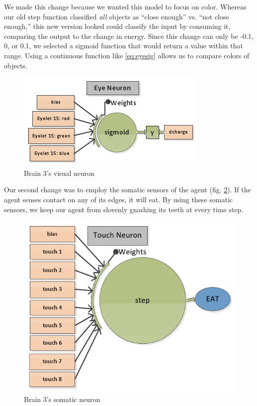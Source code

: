 We made this change because we wanted this model to focus on color. Whereas
our old step function classified \emph{all} objects as ``close enough'' vs. 
``not close enough,'' this new version looked could classify the input by 
consuming it, comparing the output to the change in energy. Since this change 
can only be -0.1, 0, or 0.1, we selected a sigmoid function that would return 
a value within that range. Using a continuous function like \eqref{eq:eyesig} 
allows us to compare colors of objects.

\begin{figure}
\begin{center}
  \includegraphics[scale=.7]{img/brain3eye.png}
  \caption{Brain 3's visual neuron}
  \label{fig:brain3eye}
\end{center}
\end{figure}

Our second change was to employ the somatic sensors of the agent
(fig. \ref{fig:brain3touch}). If the agent senses contact on any of its edges, 
it will eat. By using these somatic sensors, we keep our agent from slovenly
gnashing its teeth at every time step.

\begin{figure}
\begin{center}
  \includegraphics[scale=.5]{img/brain3touch2.png}
  \caption{Brain 3's somatic neuron}
  \label{fig:brain3touch}
\end{center}
\end{figure}

